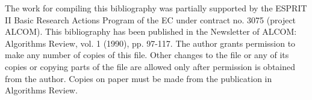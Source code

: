\setlength{\topmargin}{-.5in}
\addtolength{\textheight}{1.5in}
\addtolength{\textwidth}{\evensidemargin}
\addtolength{\textwidth}{\oddsidemargin}
\setlength{\oddsidemargin}{.25in}
\setlength{\evensidemargin}{.25in}
\addtolength{\textwidth}{-1.0\oddsidemargin}
\addtolength{\textwidth}{-1.0\evensidemargin}

\setlength{\baselineskip}{24pt}



								    									
 The work for compiling this bibliography was partially supported  	
 by the  ESPRIT II Basic Research Actions Program of the EC under  	
 contract no. 3075 (project ALCOM).  This  bibliography  has been  	
 published in the Newsletter of ALCOM:  Algorithms Review, vol. 1  	
 (1990), pp. 97-117.						    						
 The  author grants  permission to make  any number of  copies of  	
 this file.  Other  changes  to the file  or any of its copies or  	
 copying parts of the file are  allowed only after  permission is 		
 obtained from the author.  Copies on paper must be made from the  	
 publication in Algorithms Review.				    					
								    									



